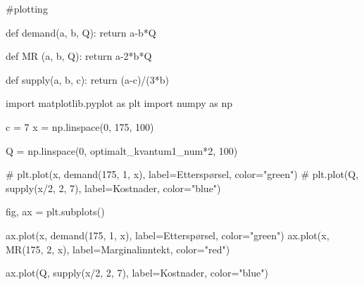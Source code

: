 \documentclass[
  12pt,
  a4paper,
  DIV=11,
  numbers=noendperiod]{scrartcl}
\newenvironment{Shaded}{\begin{snugshade}}{\end{snugshade}}
\newcommand{\CommentTok}[1]{\textcolor[rgb]{0.37,0.37,0.37}{#1}}
\newcommand{\ControlFlowTok}[1]{\textcolor[rgb]{0.00,0.23,0.31}{#1}}
\newcommand{\DecValTok}[1]{\textcolor[rgb]{0.68,0.00,0.00}{#1}}
\newcommand{\ImportTok}[1]{\textcolor[rgb]{0.00,0.46,0.62}{#1}}
\newcommand{\KeywordTok}[1]{\textcolor[rgb]{0.00,0.23,0.31}{#1}}
\newcommand{\NormalTok}[1]{\textcolor[rgb]{0.00,0.23,0.31}{#1}}
\newcommand{\OperatorTok}[1]{\textcolor[rgb]{0.37,0.37,0.37}{#1}}
\newcommand{\StringTok}[1]{\textcolor[rgb]{0.13,0.47,0.30}{#1}}
\begin{document}
\begin{Shaded}
\begin{Highlighting}[]
\CommentTok{\#plotting }

\KeywordTok{def}\NormalTok{ demand(a, b, Q):}
    \ControlFlowTok{return}\NormalTok{ a}\OperatorTok{{-}}\NormalTok{b}\OperatorTok{*}\NormalTok{Q}


\KeywordTok{def}\NormalTok{ MR (a, b, Q):}
    \ControlFlowTok{return}\NormalTok{ a}\OperatorTok{{-}}\DecValTok{2}\OperatorTok{*}\NormalTok{b}\OperatorTok{*}\NormalTok{Q}

\KeywordTok{def}\NormalTok{ supply(a, b, c):}
    \ControlFlowTok{return}\NormalTok{ (a}\OperatorTok{{-}}\NormalTok{c)}\OperatorTok{/}\NormalTok{(}\DecValTok{3}\OperatorTok{*}\NormalTok{b)}



\ImportTok{import}\NormalTok{ matplotlib.pyplot }\ImportTok{as}\NormalTok{ plt}
\ImportTok{import}\NormalTok{ numpy }\ImportTok{as}\NormalTok{ np}




\NormalTok{c }\OperatorTok{=} \DecValTok{7}
\NormalTok{x }\OperatorTok{=}\NormalTok{ np.linspace(}\DecValTok{0}\NormalTok{, }\DecValTok{175}\NormalTok{, }\DecValTok{100}\NormalTok{)}


\NormalTok{Q }\OperatorTok{=}\NormalTok{ np.linspace(}\DecValTok{0}\NormalTok{, optimalt\_kvantum1\_num}\OperatorTok{*}\DecValTok{2}\NormalTok{, }\DecValTok{100}\NormalTok{)}


\CommentTok{\# plt.plot(x, demand(175, 1, x), label=\textquotesingle{}Etterspørsel\textquotesingle{}, color="green")}
\CommentTok{\# plt.plot(Q, supply(x/2, 2, 7), label=\textquotesingle{}Kostnader\textquotesingle{}, color="blue")}

\NormalTok{fig, ax }\OperatorTok{=}\NormalTok{ plt.subplots()}

\NormalTok{ax.plot(x, demand(}\DecValTok{175}\NormalTok{, }\DecValTok{1}\NormalTok{, x), label}\OperatorTok{=}\StringTok{\textquotesingle{}Etterspørsel\textquotesingle{}}\NormalTok{, color}\OperatorTok{=}\StringTok{"green"}\NormalTok{)}
\NormalTok{ax.plot(x, MR(}\DecValTok{175}\NormalTok{, }\DecValTok{2}\NormalTok{, x), label}\OperatorTok{=}\StringTok{\textquotesingle{}Marginalinntekt\textquotesingle{}}\NormalTok{, color}\OperatorTok{=}\StringTok{"red"}\NormalTok{)}

\NormalTok{ax.plot(Q, supply(x}\OperatorTok{/}\DecValTok{2}\NormalTok{, }\DecValTok{2}\NormalTok{, }\DecValTok{7}\NormalTok{), label}\OperatorTok{=}\StringTok{\textquotesingle{}Kostnader\textquotesingle{}}\NormalTok{, color}\OperatorTok{=}\StringTok{"blue"}\NormalTok{)}





\end{Highlighting}
\end{Shaded}
\end{document}
